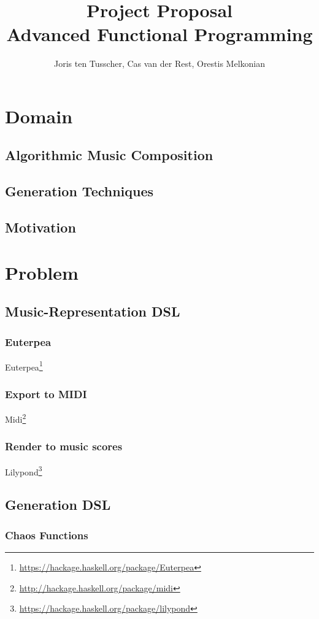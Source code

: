 \documentclass[12pt,a4paper]{article}
\title{\textbf{Project Proposal \\ \small{Advanced Functional Programming}}}
\author{\small{Joris ten Tusscher, Cas van der Rest, Orestis Melkonian}}
\date{}
\newcommand{\site}[1]{\footnote{\url{#1}}}
\begin{document}
\maketitle

\section{Domain}

\subsection{Algorithmic Music Composition}
\subsection{Generation Techniques}
\subsection{Motivation}
\cite{categorial}

\section{Problem}

\subsection{Music-Representation DSL}
\subsubsection{Euterpea}
Euterpea\site{https://hackage.haskell.org/package/Euterpea}
\subsubsection{Export to MIDI}
Midi\site{http://hackage.haskell.org/package/midi}
\subsubsection{Render to music scores}
Lilypond\site{https://hackage.haskell.org/package/lilypond}

\subsection{Generation DSL}
\subsubsection{Chaos Functions}
\cite{chaos}
\end{document}
